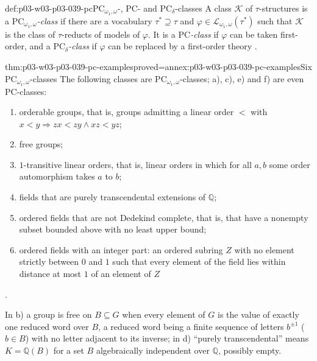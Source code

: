 \begin{hbdefinition}{def:p03-w03-p03-039-pc}{\(\mathrm{PC}_{\omega_1,\omega}\)-, \(\mathrm{PC}\)- and \(\mathrm{PC}_\delta\)-classes}
A class \(\mathcal K\) of \(\tau\)-structures is a
\emph{\(\mathrm{PC}_{\omega_1,\omega}\)-class} if there are a vocabulary
\(\tau^*\supseteq\tau\) and \(\varphi\in\mathcal L_{\omega_1,\omega}(\tau^*)\)
such that \(\mathcal K\) is the class of \(\tau\)-reducts of models of
\(\varphi\). It is a \emph{\(\mathrm{PC}\)-class} if \(\varphi\) can be taken
first-order, and a \emph{\(\mathrm{PC}_\delta\)-class} if \(\varphi\) can be
replaced by a first-order theory
\cite[Def.~1.11, p.~7]{Marker2014InfinitaryNotes}.
\end{hbdefinition}

\begin{hbtheorem}{thm:p03-w03-p03-039-pc-examples}{proved=annex:p03-w03-p03-039-pc-examples}{Six \(\mathrm{PC}_{\omega_1,\omega}\)-classes}
The following classes are \(\mathrm{PC}_{\omega_1,\omega}\)-classes; a), c),
e) and f) are even \(\mathrm{PC}\)-classes:
\begin{enumerate}
\item[a)] orderable groups, that is, groups admitting a linear order \(<\)
      with \(x<y\Rightarrow zx<zy\wedge xz<yz\);
\item[b)] free groups;
\item[c)] \(1\)-transitive linear orders, that is, linear orders in which
      for all \(a,b\) some order automorphism takes \(a\) to \(b\);
\item[d)] fields that are purely transcendental extensions of \(\mathbb Q\);
\item[e)] ordered fields that are not Dedekind complete, that is, that have a
      nonempty subset bounded above with no least upper bound;
\item[f)] ordered fields with an integer part: an ordered subring \(Z\) with
      no element strictly between \(0\) and \(1\) such that every element of
      the field lies within distance at most \(1\) of an element of \(Z\)
\end{enumerate}
\cite[Ex.~1.12, p.~7]{Marker2014InfinitaryNotes}.
\end{hbtheorem}

In b) a group is free on \(B\subseteq G\) when every element of \(G\) is the
value of exactly one reduced word over \(B\), a reduced word being a finite
sequence of letters \(b^{\pm1}\) (\(b\in B\)) with no letter adjacent to its
inverse; in d) ``purely transcendental'' means \(K=\mathbb Q(B)\) for a set
\(B\) algebraically independent over \(\mathbb Q\), possibly empty.

